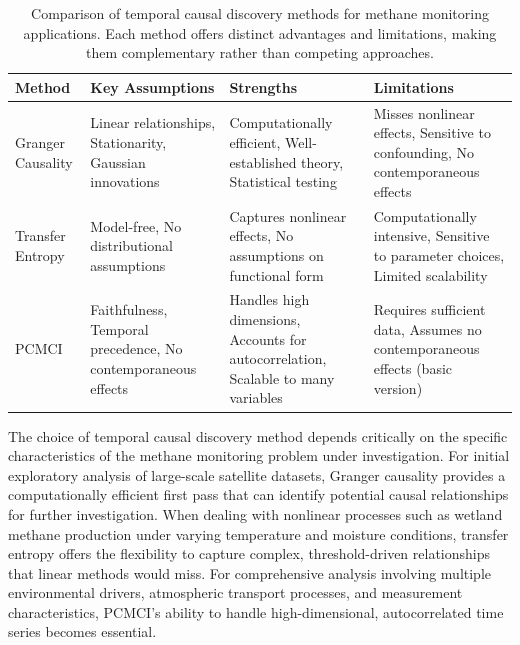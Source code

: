 \begin{table}[h!]
	\centering
	\caption[Comparison of temporal causal discovery methods]{Comparison of temporal causal discovery methods for methane monitoring applications. Each method offers distinct advantages and limitations, making them complementary rather than competing approaches.}
	\label{tab:temporal_methods_comparison}
	\begin{tabular}{|>{\raggedright\arraybackslash}p{2.5cm}|>{\raggedright\arraybackslash}p{3.5cm}|>{\raggedright\arraybackslash}p{3.5cm}|>{\raggedright\arraybackslash}p{3.5cm}|}
		\hline
		\textbf{Method}   & \textbf{Key Assumptions}                                      & \textbf{Strengths}                                                                & \textbf{Limitations}                                                           \\
		\hline
		Granger Causality & Linear relationships, Stationarity, Gaussian innovations      & Computationally efficient, Well-established theory, Statistical testing           & Misses nonlinear effects, Sensitive to confounding, No contemporaneous effects \\
		\hline
		Transfer Entropy  & Model-free, No distributional assumptions                     & Captures nonlinear effects, No assumptions on functional form                     & Computationally intensive, Sensitive to parameter choices, Limited scalability \\
		\hline
		PCMCI             & Faithfulness, Temporal precedence, No contemporaneous effects & Handles high dimensions, Accounts for autocorrelation, Scalable to many variables & Requires sufficient data, Assumes no contemporaneous effects (basic version)   \\
		\hline
	\end{tabular}
\end{table}

The choice of temporal causal discovery method depends critically on the specific characteristics of the methane monitoring problem under investigation. For initial exploratory analysis of large-scale satellite datasets, Granger causality provides a computationally efficient first pass that can identify potential causal relationships for further investigation. When dealing with nonlinear processes such as wetland methane production under varying temperature and moisture conditions, transfer entropy offers the flexibility to capture complex, threshold-driven relationships that linear methods would miss. For comprehensive analysis involving multiple environmental drivers, atmospheric transport processes, and measurement characteristics, PCMCI's ability to handle high-dimensional, autocorrelated time series becomes essential.

